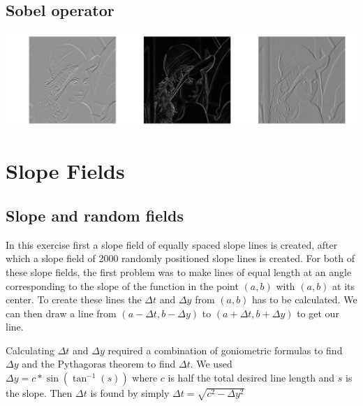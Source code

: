 \documentclass[a4paper,12px]{article}
\begin{document}
\subsection{Sobel operator}



\begin{center}
    \includegraphics[width=\textwidth]{sobel}
\end{center}

\clearpage
\section{Slope Fields}
\subsection{Slope and random fields}

In this exercise first a slope field of equally spaced slope lines is created,
after which a slope field of 2000 randomly positioned slope lines is created.
For both of these slope fields, the first problem was to make lines of equal
length at an angle corresponding to the slope of the function in the point
$(a,b)$ with $(a,b)$ at its center. To create these lines the $\Delta t$ and
$\Delta y$ from $(a,b)$ has to be calculated. We can then draw a line from
$(a-\Delta t, b-\Delta y)$ to $(a+\Delta t, b+\Delta y)$ to get our line.

Calculating $\Delta t$ and $\Delta y$ required a combination of goniometric
formulas to find $\Delta y$ and the Pythagoras theorem to find $\Delta t$.  We
used $\Delta y = c*\sin(\tan^{-1}(s))$ where $c$ is half the total
desired line length and $s$ is the slope. Then $\Delta t$ is found by simply
$\Delta t= \sqrt{c^2-\Delta y^2}$
\end{document}
